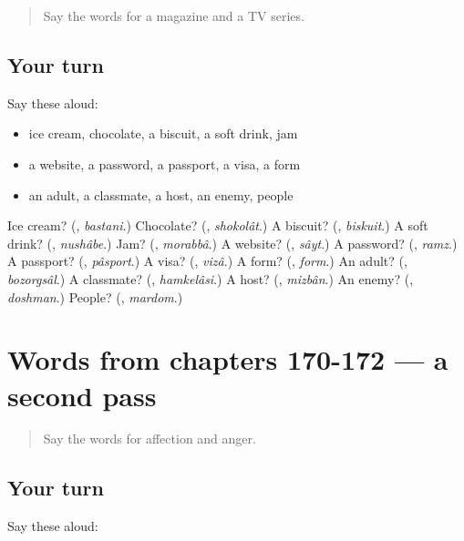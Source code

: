 \label{lesson:FA-R172-first-pass-words-from-chapters-167-169}



\begin{quote}
Say the words for a magazine and a TV series.
\end{quote}

\subsection*{Your turn}
Say these aloud:

\begin{itemize}
\raggedright
  \item ice cream, chocolate, a biscuit, a soft drink, jam
  \item a website, a password, a passport, a visa, a form
  \item an adult, a classmate, a host, an enemy, people
\end{itemize}

\begin{tcolorbox}[breakable,colback=teal!4,colframe=teal!35!black,title={Before you move on}]
Ice cream? (\textbf{}, \emph{bastani}.) Chocolate? (\textbf{}, \emph{shokolât}.) A biscuit? (\textbf{}, \emph{biskuit}.) A soft drink? (\textbf{}, \emph{nushâbe}.) Jam? (\textbf{}, \emph{morabbâ}.) A website? (\textbf{}, \emph{sâyt}.) A password? (\textbf{}, \emph{ramz}.) A passport? (\textbf{}, \emph{pâsport}.) A visa? (\textbf{}, \emph{vizâ}.) A form? (\textbf{}, \emph{form}.) An adult? (\textbf{}, \emph{bozorgsâl}.) A classmate? (\textbf{}, \emph{hamkelâsi}.) A host? (\textbf{}, \emph{mizbân}.) An enemy? (\textbf{}, \emph{doshman}.) People? (\textbf{}, \emph{mardom}.)
\end{tcolorbox}
\section[(dialogue)]{Words from chapters 170-172 — a second pass}

\label{lesson:FA-R172-second-pass-words-from-chapters-170-172}



\begin{quote}
Say the words for affection and anger.
\end{quote}

\subsection*{Your turn}
Say these aloud:

